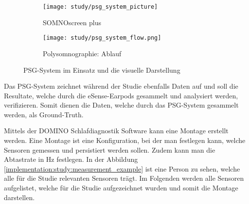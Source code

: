 \begin{figure}[ht]
    \centering
    \begin{subfigure}{.4\textwidth}
        \begin{center}
            \texttt{[image: study/psg\_system\_picture]}
        \end{center}
        \caption{{SOMNOscreen \texttrademark} plus}
    \end{subfigure}
    \begin{subfigure}{.58\textwidth}
        \begin{center}
            \texttt{[image: study/psg\_system\_flow.png]}
        \end{center}
        \caption{Polysomnographie: Ablauf}
    \end{subfigure}
    \caption{PSG-System im Einsatz und die visuelle Darstellung\protect\footnotemark}
    \label{analysis:psg:picture}
  \end{figure}


Das PSG-System zeichnet während der Studie ebenfalls Daten auf und soll die Resultate, welche durch die eSense-Earpods gesammelt und analysiert werden, verifizieren. Somit dienen die Daten, welche durch das PSG-System gesammelt werden, als \glqq Ground-Truth\grqq.

Mittels der {\glqq DOMINO Schlafdiagnostik\grqq} Software kann eine Montage erstellt werden. 
Eine Montage ist eine Konfiguration, bei der man festlegen kann, welche Sensoren gemessen und persistiert werden sollen. Zudem kann man die Abtastrate in $\si{\hertz}$ festlegen.
In der Abbildung \ref{implementation:study:measurement_example} ist eine Person zu sehen, welche alle für die Studie relevanten Sensoren trägt.
Im Folgenden werden alle Sensoren aufgelistet, welche für die Studie aufgezeichnet wurden und somit die Montage darstellen.

